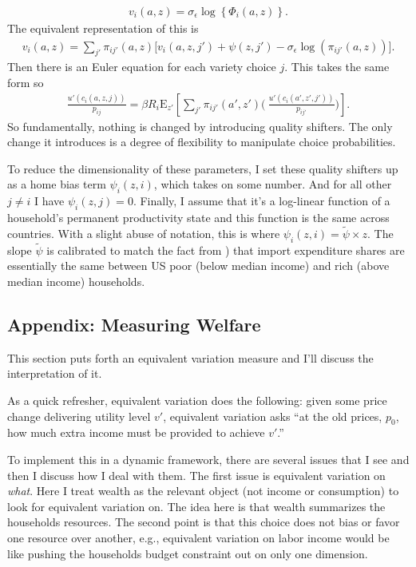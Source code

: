 \documentclass[12pt,pdftex]{article}
\begin{document}
\begin{onehalfspacing}
\begin{align}
v_i(a, z) = \sigma_{\epsilon} \log \left\{ \Phi_{i}(a,z)  \right\}.
\end{align}
The equivalent representation of this is
\begin{align}
v_i(a, z) = \sum_{j'} \pi_{ij'}(a, z) \bigg[ v_{i}(a, z, j') + \psi(z, j') - \sigma_{\epsilon} \log (\pi_{ij'}(a, z))  \bigg].
\end{align}
Then there is an Euler equation for each variety choice $j$. This takes the same form so
\begin{align}
\frac{u'(c_{i}(a, z, j))}{p_{ij}} = \beta R_{i} \mathrm{E}_{z'} \left[ \sum_{j'} \pi_{ij'}(a', z') \bigg( \ \frac{u'(c_{i}(a', z', j'))}{p_{ij'}} \bigg) \right].
\end{align}
So fundamentally, nothing is changed by introducing quality shifters. The only change it introduces is a degree of flexibility to manipulate choice probabilities. 

To reduce the dimensionality of these parameters, I set these quality shifters up as a home bias term $\psi_{i}(z,i)$, which takes on some number. And for all other $j \neq i$ I have $\psi_{i}(z,j) = 0$. Finally, I assume that it's a log-linear function of a household's permanent productivity state and this function is the same across countries. With a slight abuse of notation, this is where $\psi_{i}(z,i) = \tilde \psi \times z$. The slope $\tilde \psi$ is calibrated to match the fact from \citet{borusyak2021distributional}) that import expenditure shares are essentially the same between US poor (below median income) and rich (above median income) households.

\subsection{Appendix: Measuring Welfare}

This section puts forth an equivalent variation measure and I'll discuss the interpretation of it.

As a quick refresher, equivalent variation does the following: given some price change delivering utility level $v'$, equivalent variation asks ``at the old prices, $p_0$, how much extra income must be provided to achieve $v'$.''

To implement this in a dynamic framework, there are several issues that I see and then I discuss how I deal with them. The first issue is equivalent variation on \emph{what}. Here I treat wealth as the relevant object (not income or consumption) to look for equivalent variation on. The idea here is that wealth summarizes the households resources. The second point is that this choice does not bias or favor one resource over another, e.g., equivalent variation on labor income would be like pushing the households budget constraint out on only one dimension.


\end{onehalfspacing}
\end{document}
